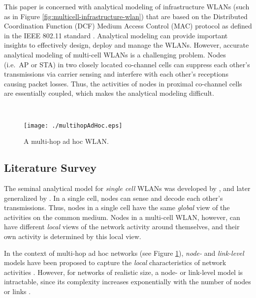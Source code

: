 \documentclass[10pt,a4paper,journal]{IEEEtran}
\theoremstyle{definition}
\theoremstyle{remark}
\theoremstyle{plain}
\begin{document}
This paper is concerned with analytical modeling of infrastructure WLANs (such as in Figure \ref{fig:multicell-infrastructure-wlan}) that are based on the Distributed Coordination Function (DCF) Medium Access Control (MAC) protocol as defined in the IEEE 802.11 standard \cite{wanet.IEEE802dot11standard2007}. Analytical modeling can provide important insights to effectively design, deploy and manage the WLANs. However, accurate analytical modeling of multi-cell WLANs is a challenging problem. Nodes (i.e.~AP or STA) in two closely located co-channel cells can suppress each other's transmissions via carrier sensing and interfere with each other's receptions causing packet losses. Thus, the activities of nodes in proximal co-channel cells are essentially coupled, which makes the analytical modeling difficult. 



\begin{figure}[tb]
\centering \
\begin{minipage}{7.8cm}
\begin{center}
\texttt{[image: ./multihopAdHoc.eps]}
\caption{A multi-hop ad hoc WLAN. \label{fig:multihopAdHoc}}
\end{center}
\end{minipage}
\end{figure}





\subsection{Literature Survey}
\label{subsec:literature-survey} 




The seminal analytical model for \textit{single cell} WLANs was developed by \cite{wanet.bianchi00performance}, and later generalized by \cite{wanet.kumar_etal07new_insights}. In a single cell, nodes can sense and decode each other's transmissions. Thus, nodes in a single cell have the same \textit{global} view of the activities on the common medium. Nodes in a multi-cell WLAN, however, can have different \textit{local} views of the network activity around themselves, and their own activity is determined by this local view. 

In the context of multi-hop ad hoc networks (see Figure \ref{fig:multihopAdHoc}), \textit{node-} and \textit{link-level} models have been proposed to capture the \textit{local} characteristics of network activities \cite{wanet.boorstyn87multihop,wanet.wang-kar05multihop,wanet.garetto_etal08starvation}. However, for networks of realistic size, a node- or link-level model is intractable, since its complexity increases exponentially with the number of nodes or links \cite{wanet.kershenbaum-etal87complex}. 
\end{document}
